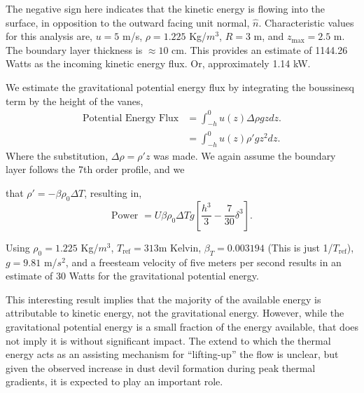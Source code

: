 
The negative sign here indicates that the kinetic energy is flowing into
the surface, in opposition to the outward facing unit normal, $\hat
n$. Characteristic values for this analysis are, $u = 5$ m/s, $\rho =
1.225$ Kg/$m^3$, $R = 3$ m, and $z_{\text{max}} = 2.5$ m. The boundary
layer thickness is $\approx 10$ cm. This provides
an estimate of 1144.26 Watts as the incoming kinetic energy flux. Or,
approximately 1.14 kW.  

We estimate the gravitational potential
energy flux by integrating the boussinesq term by the height of the vanes, 
\begin{align*}
  \text{Potential Energy Flux} & = \int_{-h}^0 u(z) \Delta \rho g z dz. \\
  & = \int_{-h}^0 u(z) \rho' g z^2 dz. 
\end{align*}
Where the substitution, $\Delta \rho = \rho' z$ was made. We again
assume the boundary layer follows the 7th order profile, and we 

%
that $\rho' = -\beta \rho_0 \Delta T$, resulting in, 
%
%
\begin{equation}
 \text{Power } = U \beta \rho_0 \Delta T g \left[ \frac{h^3}{3} -
					    \frac{7}{30} \delta^3
					   \right]. 
\end{equation}

Using $\rho_0 = 1.225$ Kg/$m^3$, $T_{\text{ref}}=313$m Kelvin, $\beta_T
= 0.003194$ (This is just 1/$T_{\text{ref}}$), $g=9.81$ m/$s^2$, and a
freesteam velocity of five meters per second results in an
estimate of 30 Watts for the gravitational potential energy. 

This interesting result implies that the majority of the available
energy is attributable to kinetic energy, not the gravitational
energy. 
However, while the
gravitational potential energy is a small fraction of the energy
available, that does not imply it is without significant impact. The
extend to which the thermal energy acts as an assisting mechanism for 
``lifting-up'' the flow is unclear, but given the observed increase in dust
devil formation during peak thermal gradients, it is expected
to play an important role. 

